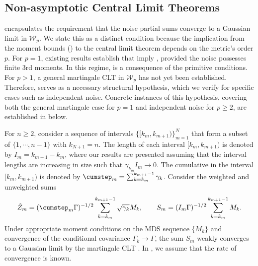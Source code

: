 \documentclass[11pt]{article}
\begin{document}
\subsection{Non-asymptotic Central Limit Theorems}\label{sec:nonasymptotic_CLT}
 encapsulates the requirement that the noise partial sums converge to a Gaussian limit in $\mathcal{W}_p$. 
We state this as a distinct condition because the implication from the moment bounds () to the central limit theorem depends on the metric's order $p$.
For $p=1$, existing results \citep{srikant2024CLT} establish that  imply , provided the noise possesses finite 3rd moments. 
In this regime,  is a consequence of the primitive conditions. 
For $p > 1$, a general martingale CLT in $\mathcal{W}_p$ has not yet been established.
Therefore,  serves as a necessary structural hypothesis, which we verify for specific cases such as independent noise.
Concrete instances of this hypothesis, covering both the general martingale case for $p=1$ and independent noise for $p \ge 2$, are established in  below.

    




For $n \geq 2$, consider a sequence of intervals $\{[k_m, k_{m+1})\}_{m=1}^{N}$ that form a subset of $\{1, \cdots, n-1\}$ with $k_{N+1} = n$.
The length of each interval $[k_m, k_{m+1})$ is denoted by $I_m = k_{m+1} - k_m$, where our results are presented assuming that the interval lengths are increasing in size such that $\gamma_{k_m}I_m \to 0$. 
The cumulative \stepsize in the interval $[k_m, k_{m+1})$ is denoted by $\cumstep_m = \sum_{k=k_m}^{k_{m+1} - 1} \gamma_k$.
Consider the weighted and unweighted sums
\begin{equation}\label{eq:SmZm}
    \hat{Z}_m = (\cumstep_m \Gamma)^{-1/2} \sum_{k=k_m}^{k_{m+1} - 1} \sqrt{\gamma_k} M_k , 
    \qquad 
    S_m = (I_m \Gamma)^{-1/2} \sum_{k=k_m}^{k_{m+1} - 1} M_k . 
\end{equation}
Under appropriate moment conditions on the MDS sequence $\{M_k\}$ and convergence of the conditional covariance $\Gamma_k \to \Gamma$, the sum $S_m$ weakly converges to a Gaussian limit by the martingale CLT \citep{hallp1980martingalelimittheoryanditsapplication}.
In , we assume that the rate of convergence is known. 
\end{document}
